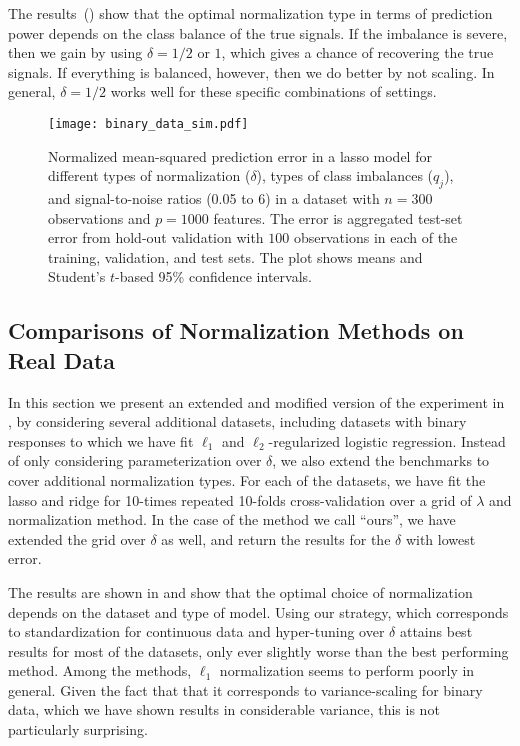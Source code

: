 The results~() show that the optimal normalization type in terms of
prediction power depends on the class balance of the true signals. If the imbalance is
severe, then we gain by using \(\delta=1/2\) or \(1\), which gives a chance of recovering
the true signals. If everything is balanced, however, then we do better by not scaling. In
general, \(\delta=1/2\) works well for these specific combinations of settings.

\begin{figure}[htpb]
  \centering
  \texttt{[image: binary\_data\_sim.pdf]}
  \caption{%
    Normalized mean-squared prediction error in a lasso model for different types of
    normalization (\(\delta\)), types of class imbalances (\(q_j\)), and signal-to-noise ratios
    (0.05 to 6) in a dataset with \(n=300\) observations and \(p = \num{1000}\) features. The
    error is aggregated test-set error from hold-out validation with \(100\) observations in
    each of the training, validation, and test sets. The plot shows means and Student's
    \(t\)-based 95\% confidence intervals. } \label{fig:binary-sim}
\end{figure}

\subsection{Comparisons of Normalization Methods on Real Data}
\label{sec:normalization-tuning}

In this section we present an extended and modified version of the experiment in
, by considering several additional datasets,
including datasets with binary responses to which we have fit \(\ell_1\) and
\(\ell_2\)-regularized logistic regression. Instead of only considering parameterization
over \(\delta\), we also extend the benchmarks to cover additional normalization types. For
each of the datasets, we have fit the lasso and ridge for 10-times repeated 10-folds
cross-validation over a grid of \(\lambda\) and normalization method. In the case of the
method we call ``ours'', we have extended the grid over \(\delta\) as well, and return the
results for the \(\delta\) with lowest error.

The results are shown in  and show that the optimal choice of
normalization depends on the dataset and type of model. Using our strategy, which
corresponds to standardization for continuous data and hyper-tuning over \(\delta\) attains
best results for most of the datasets, only ever slightly worse than the best performing
method. Among the methods, \(\ell_1\) normalization seems to perform poorly in general.
Given the fact that that it corresponds to variance-scaling for binary data, which we have
shown results in considerable variance, this is not particularly surprising.

